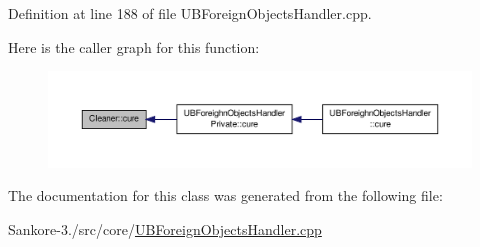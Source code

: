 Definition at line 188 of file U\-B\-Foreign\-Objects\-Handler.\-cpp.



Here is the caller graph for this function\-:
\nopagebreak
\begin{figure}[H]
\begin{center}
\leavevmode
\includegraphics[width=350pt]{df/d1b/class_cleaner_a6ba5fe8cb906e0387b7c9fdde76eaa69_icgraph}
\end{center}
\end{figure}




The documentation for this class was generated from the following file\-:\begin{DoxyCompactItemize}
\item 
Sankore-\/3./src/core/\hyperlink{_u_b_foreign_objects_handler_8cpp}{U\-B\-Foreign\-Objects\-Handler.\-cpp}\end{DoxyCompactItemize}
